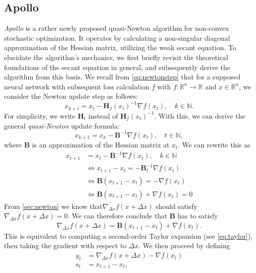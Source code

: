\subsection{Apollo \cite{apollo}}
\label{sec:apollo}
\emph{Apollo} \cite{apollo} is a rather newly proposed quasi-Newton algorithm for non-convex stochastic
optimization. It operates by calculating a non-singular diagonal approximation  of the Hessian matrix,
utilizing the weak secant equation. To elucidate the algorithm's mechanics, we first briefly
revisit the theoretical foundations of the secant equation in general, and subsequently derive
the algorithm from this basis. We recall from \ref{eq:newtonstep} that for a supposed neural network with subsequent
loss calculation $f$ with $f: \mathbb{R}^n \to \mathbb{R}$ and $x \in \mathbb{R}^n$, we consider the Newton update step as follows:
\begin{equation}
    x_{k+t} = x_t - \mathbf{H}_f(x_t)^{-1} \nabla f(x_t), \quad k \in \mathbb{N}.
\end{equation}
For simplicity, we write $\mathbf{H}_t$ instead of $\mathbf{H}_f(x_t)^{-1}$. With this, we can derive the general \emph{quasi-Newton} update formula:
\begin{equation}
    x_{k+1} = x_k - \mathbf{B}^{-1} \nabla f(x_t), \quad t \in \mathbb{N},
\end{equation}
where $\mathbf{B}$ is an approximation of the Hessian matrix at $x_t$.
We can rewrite this as
\begin{align}
    x_{t+1} &= x_t - \mathbf{B}^{-1} \nabla f(x_t), \quad k \in \mathbb{N} \nonumber \\
    &\Longleftrightarrow x_{t+1} - x_t = - \mathbf{B}_t^{-1} \nabla f(x_t) \nonumber \\
    &\Longleftrightarrow \mathbf{B}(x_{t+1} - x_t) = - \nabla f(x_t) \nonumber \\
    &\Longleftrightarrow \mathbf{B}(x_{t+1} - x_t) + \nabla f(x_t) = 0
\end{align}
From \ref{sec:newton} we know that$\nabla_{\Delta x} f(x+\Delta x)$ should satisfy $\nabla_{\Delta x} f(x+\Delta x) = 0$. We can therefore 
conclude that $\mathbf{B}$ has to satisfy
\begin{equation}
    \nabla_{\Delta x} f(x+\Delta x) = \mathbf{B}(x_{t+1} - x_t) + \nabla f(x_t).
\end{equation}
This is equivalent to computing a second-order Taylor expansion (see \ref{eq:taylor}), then taking the gradient with respect to $\Delta x$.
We then proceed by defining
\begin{align}
    y_t &= \nabla_{\Delta x} f(x+\Delta x) -  \nabla f(x_t) \\
    s_t &= x_{t+1} - x_t,
\end{align}
